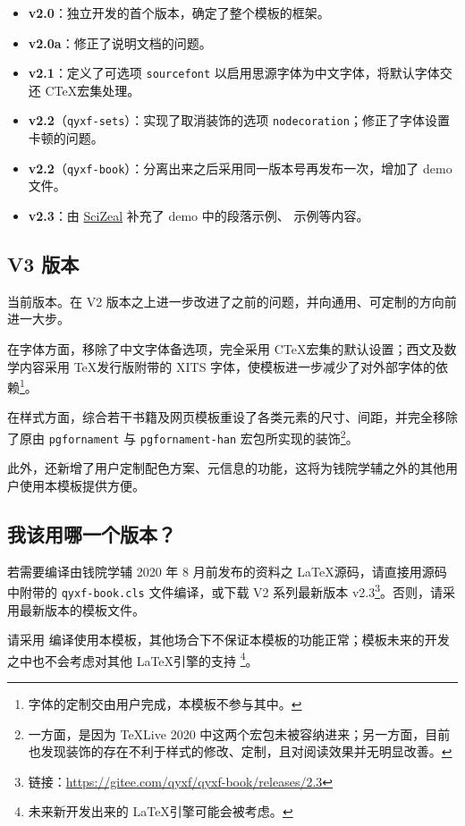 \documentclass[
  10pt,
  twoside,
  openany,
  b5paper, %
  colorscheme = rbb, %
  xits = false,
]{qyxf-book}
\begin{document}
\begin{itemize}
  \item \textbf{v2.0}：独立开发的首个版本，确定了整个模板的框架。
  \item \textbf{v2.0a}：修正了说明文档的问题。
  \item \textbf{v2.1}：定义了可选项 \verb|sourcefont| 以启用思源字体为中文字体，将默认字体交还 C\TeX 宏集处理。
  \item \textbf{v2.2}（\verb|qyxf-sets|）：实现了取消装饰的选项 \verb|nodecoration|；修正了字体设置卡顿的问题。
  \item \textbf{v2.2}（\verb|qyxf-book|）：分离出来之后采用同一版本号再发布一次，增加了 demo 文件。
  \item \textbf{v2.3}：由 \href{https://github.com/SciZeal}{SciZeal} 补充了 demo 中的段落示例、 示例等内容。
\end{itemize}

\subsection{V3 版本}

当前版本。在 V2 版本之上进一步改进了之前的问题，并向通用、可定制的方向前进一大步。

在字体方面，移除了中文字体备选项，完全采用 C\TeX 宏集的默认设置；西文及数学内容采用 \TeX 发行版附带的 XITS 字体，使模板进一步减少了对外部字体的依赖\footnote{字体的定制交由用户完成，本模板不参与其中。}。

在样式方面，综合若干书籍及网页模板重设了各类元素的尺寸、间距，并完全移除了原由 \verb|pgfornament| 与 \verb|pgfornament-han| 宏包所实现的装饰\footnote{一方面，是因为 \TeX Live 2020 中这两个宏包未被容纳进来；另一方面，目前也发现装饰的存在不利于样式的修改、定制，且对阅读效果并无明显改善。}。

此外，还新增了用户定制配色方案、元信息的功能，这将为钱院学辅之外的其他用户使用本模板提供方便。

\subsection{我该用哪一个版本？}

若需要编译由钱院学辅 2020 年 8 月前发布的资料之 \LaTeX 源码，请直接用源码中附带的 \verb|qyxf-book.cls| 文件编译，或下载 V2 系列最新版本 v2.3\footnote{链接：\url{https://gitee.com/qyxf/qyxf-book/releases/2.3}}。否则，请采用最新版本的模板文件。

\begin{alert}
  请采用  编译使用本模板，其他场合下不保证本模板的功能正常；模板未来的开发之中也不会考虑对其他 \LaTeX 引擎的支持
  \footnote{未来新开发出来的 \LaTeX 引擎可能会被考虑。}。
\end{alert}
\end{document}
